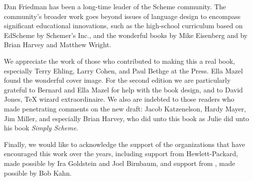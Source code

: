 Dan Friedman has been a long-time leader of the Scheme community.
The community’s broader work goes beyond issues of language design to encompass significant educational innovations, such as the high-school curriculum based on EdScheme by Schemer’s Inc., and the wonderful books by Mike Eisenberg and by Brian Harvey and Matthew Wright.

We appreciate the work of those who contributed to making this a real book, especially Terry Ehling, Larry Cohen, and Paul Bethge at the  Press.
Ella Mazel found the wonderful cover image.
For the second edition we are particularly grateful to Bernard and Ella Mazel for help with the book design, and to David Jones, \TeX{} wizard extraordinaire.
We also are indebted to those readers who made penetrating comments on the new draft:
Jacob Katzenelson, Hardy Mayer, Jim Miller, and especially Brian Harvey, who did unto this book as Julie did unto his book \textit{Simply Scheme}.

Finally, we would like to acknowledge the support of the organizations that have encouraged this work over the years, including support from Hewlett-Packard, made possible by Ira Goldstein and Joel Birnbaum, and support from , made possible by Bob Kahn.
